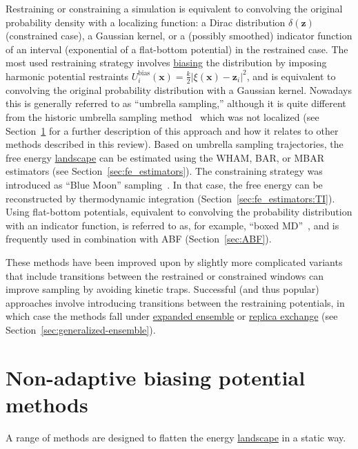 \documentclass[9pt,review]{livecoms}
\newcommand{\vx}{\mathbf{x}}
\newcommand{\vz}{\mathbf{z}}
\begin{document}
Restraining or constraining a simulation is equivalent
to convolving the original probability density with a localizing function: a Dirac distribution $\delta(\vz)$ (constrained case),
a Gaussian kernel, or a (possibly smoothed) indicator function of an interval (exponential of a flat-bottom potential) in the restrained case.
The most used restraining strategy involves \hyperlink{ref:biasingE} {biasing} the distribution by imposing harmonic potential restraints $U^{\mathrm{bias}}_i(\vx) = \frac{k}{2} |\xi(\vx)-\vz_i|^2$, and is equivalent to convolving the original probability distribution with a Gaussian kernel.
Nowadays this is generally referred to as ``umbrella sampling,'' although it is quite different from the historic umbrella sampling method~\cite{TORRIE1977187} which was not localized (see Section~\ref{sec:biasing_potential} for a further description of this approach and how it relates to other methods described in this review).
Based on umbrella sampling trajectories, the free energy \hyperlink{ref:FES} {landscape} can be estimated using the WHAM, BAR, or MBAR estimators (see Section~\ref{sec:fe_estimators}). The constraining strategy was introduced as ``Blue Moon'' sampling~\cite{doi:10.1080/0892702042000270214}. In that case, the free energy can be reconstructed by thermodynamic integration (Section~\ref{sec:fe_estimators:TI}). Using flat-bottom potentials, equivalent to convolving the probability distribution with an indicator function, is referred to as, for example, ``boxed MD''~\cite{doi:10.1021/jp9074898}, and is frequently used in combination with ABF (Section~\ref{sec:ABF}).

These methods have been improved upon by slightly more complicated variants that include transitions between the restrained or constrained windows can improve sampling by avoiding kinetic traps. Successful (and thus popular) approaches involve introducing transitions between the restraining potentials, in which case the methods fall under \hyperlink{ref:ExpEns} {expanded ensemble} or \hyperlink{ref:ReplEx} {replica exchange} (see Section~\ref{sec:generalized-ensemble}).


\section{Non-adaptive biasing potential methods}
\label{sec:biasing_potential}

A range of methods are designed to flatten the energy \hyperlink{ref:FES} {landscape} in a static way.
\end{document}

